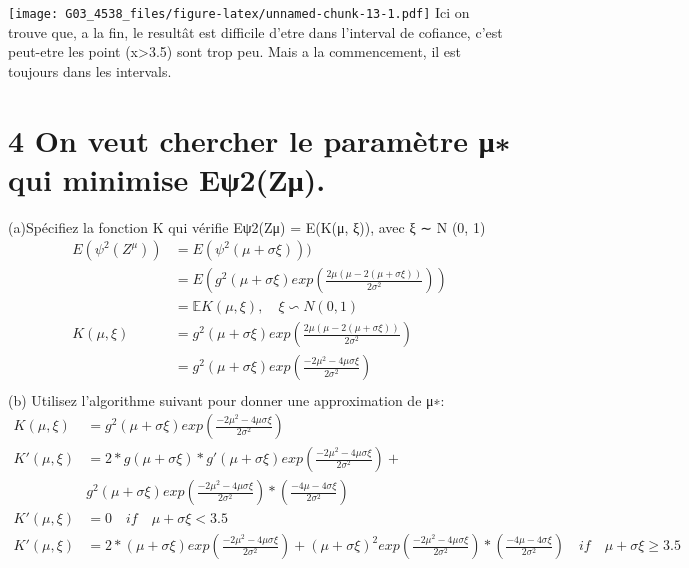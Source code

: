\documentclass[]{article}
\begin{document}
\texttt{[image: G03\_4538\_files/figure-latex/unnamed-chunk-13-1.pdf]} Ici
on trouve que, a la fin, le resultât est difficile d'etre dans
l'interval de cofiance, c'est peut-etre les point (x\textgreater{}3.5)
sont trop peu. Mais a la commencement, il est toujours dans les
intervals.

\section{4 On veut chercher le paramètre μ∗ qui minimise
Eψ2(Zμ).}\label{on-veut-chercher-le-parametre--qui-minimise-e2z.}

(a)Spécifiez la fonction K qui vérifie Eψ2(Zμ) = E(K(μ, ξ)), avec ξ ∼ N
(0, 1) \[
\begin{aligned}
E(\psi^2(Z^{\mu}))&=E(\psi^2(\mu+\sigma\xi))) \\
&= E(g^2(\mu+\sigma\xi)exp(\frac{2\mu(\mu-2(\mu+\sigma\xi))}{2\sigma^2}))\\
&= \mathbb{E}K(\mu,\xi),\quad\xi\backsim N(0,1)\\
K(\mu,\xi)&=g^2(\mu+\sigma\xi)exp(\frac{2\mu(\mu-2(\mu+\sigma\xi))}{2\sigma^2})\\
&=g^2(\mu+\sigma\xi)exp(\frac{-2\mu^2-4\mu\sigma\xi}{2\sigma^2})\\
\end{aligned}
\] (b) Utilisez l'algorithme suivant pour donner une approximation de
μ∗: \[
\begin{aligned}
K(\mu,\xi)&=g^2(\mu+\sigma\xi)exp(\frac{-2\mu^2-4\mu\sigma\xi}{2\sigma^2})\\
K'(\mu,\xi)&=2*g(\mu+\sigma\xi)*g'(\mu+\sigma\xi)exp(\frac{-2\mu^2-4\mu\sigma\xi}{2\sigma^2})+\\
 &  g^2(\mu+\sigma\xi)exp(\frac{-2\mu^2-4\mu\sigma\xi}{2\sigma^2})*(\frac{-4\mu-4\sigma\xi}{2\sigma^2})\\
 K'(\mu,\xi)&=0 \quad if \quad \mu+\sigma\xi<3.5\\
  K'(\mu,\xi)&=2*(\mu+\sigma\xi)exp(\frac{-2\mu^2-4\mu\sigma\xi}{2\sigma^2})+(\mu+\sigma\xi)^2exp(\frac{-2\mu^2-4\mu\sigma\xi}{2\sigma^2})*(\frac{-4\mu-4\sigma\xi}{2\sigma^2}) \quad if \quad \mu+\sigma\xi \ge 3.5
\end{aligned}
\]
\end{document}
